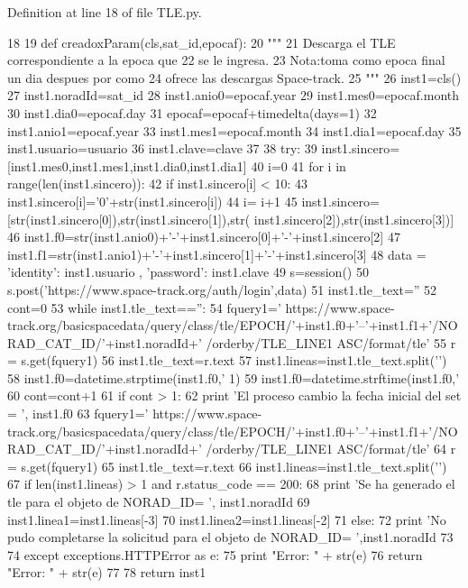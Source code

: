 \-Definition at line 18 of file \-T\-L\-E.\-py.


\begin{DoxyCode}
18 
19     def creadoxParam(cls,sat_id,epocaf):
20         """
21         Descarga el TLE correspondiente a la epoca que
22         se le ingresa.
23         Nota:toma como epoca final un dia despues por como 
24         ofrece las descargas Space-track.
25         """
26         inst1=cls()
27         inst1.noradId=sat_id
28         inst1.anio0=epocaf.year
29         inst1.mes0=epocaf.month
30         inst1.dia0=epocaf.day
31         epocaf=epocaf+timedelta(days=1)
32         inst1.anio1=epocaf.year
33         inst1.mes1=epocaf.month
34         inst1.dia1=epocaf.day
35         inst1.usuario=usuario
36         inst1.clave=clave
37         
38         try:
39             inst1.sincero=[inst1.mes0,inst1.mes1,inst1.dia0,inst1.dia1]
40             i=0
41             for i in range(len(inst1.sincero)):           
42                 if inst1.sincero[i] < 10:
43                     inst1.sincero[i]='0'+str(inst1.sincero[i])
44                 i= i+1
45             inst1.sincero=[str(inst1.sincero[0]),str(inst1.sincero[1]),str(
      inst1.sincero[2]),str(inst1.sincero[3])]
46             inst1.f0=str(inst1.anio0)+'-'+inst1.sincero[0]+'-'+inst1.sincero[2]
47             inst1.f1=str(inst1.anio1)+'-'+inst1.sincero[1]+'-'+inst1.sincero[3]
48             data = {'identity': inst1.usuario , 'password': inst1.clave}
49             s=session() 
50             s.post('https://www.space-track.org/auth/login',data)
51             inst1.tle_text=''
52             cont=0
53             while inst1.tle_text=='':
54                 fquery1='
      https://www.space-track.org/basicspacedata/query/class/tle/EPOCH/'+inst1.f0+'--'+inst1.f1+'/NORAD_CAT_ID/'+inst1.noradId+'
      /orderby/TLE_LINE1 ASC/format/tle'
55                 r = s.get(fquery1)
56                 inst1.tle_text=r.text
57                 inst1.lineas=inst1.tle_text.split('\n')
58                 inst1.f0=datetime.strptime(inst1.f0,'%
      1)
59                 inst1.f0=datetime.strftime(inst1.f0,'%
60                 cont=cont+1
61             if cont > 1:
62                     print 'El proceso cambio la fecha inicial del set = ', 
      inst1.f0
63             fquery1='
      https://www.space-track.org/basicspacedata/query/class/tle/EPOCH/'+inst1.f0+'--'+inst1.f1+'/NORAD_CAT_ID/'+inst1.noradId+'
      /orderby/TLE_LINE1 ASC/format/tle'
64             r = s.get(fquery1)
65             inst1.tle_text=r.text
66             inst1.lineas=inst1.tle_text.split('\n')
67             if len(inst1.lineas) > 1 and r.status_code == 200:
68                 print 'Se ha generado el tle para el objeto de NORAD_ID= ',
      inst1.noradId
69                 inst1.linea1=inst1.lineas[-3]
70                 inst1.linea2=inst1.lineas[-2]
71             else:
72                 print 'No pudo completarse la solicitud para el objeto de
       NORAD_ID= ',inst1.noradId                      
73     
74         except exceptions.HTTPError as e:
75             print "Error: " + str(e)
76             return "Error: " + str(e)
77 
78         return inst1
    
\end{DoxyCode}

